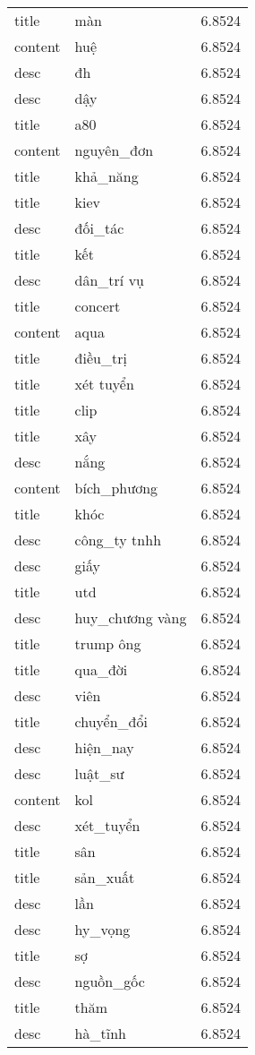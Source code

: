 \documentclass{article}
\begin{document}
\begin{tabular}{lll}
title & màn & 6.8524\\
content & huệ & 6.8524\\
desc & đh & 6.8524\\
desc & dậy & 6.8524\\
title & a80 & 6.8524\\
content & nguyên\_đơn & 6.8524\\
title & khả\_năng & 6.8524\\
title & kiev & 6.8524\\
desc & đối\_tác & 6.8524\\
title & kết & 6.8524\\
desc & dân\_trí vụ & 6.8524\\
title & concert & 6.8524\\
content & aqua & 6.8524\\
title & điều\_trị & 6.8524\\
title & xét tuyển & 6.8524\\
title & clip & 6.8524\\
title & xây & 6.8524\\
desc & nắng & 6.8524\\
content & bích\_phương & 6.8524\\
title & khóc & 6.8524\\
desc & công\_ty tnhh & 6.8524\\
desc & giấy & 6.8524\\
title & utd & 6.8524\\
desc & huy\_chương vàng & 6.8524\\
title & trump ông & 6.8524\\
title & qua\_đời & 6.8524\\
desc & viên & 6.8524\\
title & chuyển\_đổi & 6.8524\\
desc & hiện\_nay & 6.8524\\
desc & luật\_sư & 6.8524\\
content & kol & 6.8524\\
desc & xét\_tuyển & 6.8524\\
title & sân & 6.8524\\
title & sản\_xuất & 6.8524\\
desc & lần & 6.8524\\
desc & hy\_vọng & 6.8524\\
title & sợ & 6.8524\\
desc & nguồn\_gốc & 6.8524\\
title & thăm & 6.8524\\
desc & hà\_tĩnh & 6.8524\\

\end{tabular}
\end{document}
